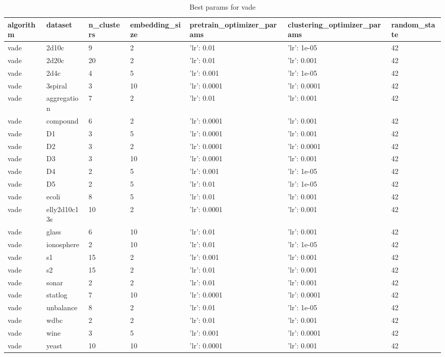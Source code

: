 \begin{table}[H]
\centering
\caption{Best params for vade}
\label{tab:params:vade}
\begin{tabular}{|l|l|l|l|l|l|l|}
\hline
algorithm & dataset & n\_clusters & embedding\_size & pretrain\_optimizer\_params & clustering\_optimizer\_params & random\_state \\
\hline
vade & 2d10c & 9 & 2 & {'lr': 0.01} & {'lr': 1e-05} & 42 \\
\hline
vade & 2d20c & 20 & 2 & {'lr': 0.01} & {'lr': 0.001} & 42 \\
\hline
vade & 2d4c & 4 & 5 & {'lr': 0.001} & {'lr': 1e-05} & 42 \\
\hline
vade & 3spiral & 3 & 10 & {'lr': 0.0001} & {'lr': 0.0001} & 42 \\
\hline
vade & aggregation & 7 & 2 & {'lr': 0.01} & {'lr': 0.001} & 42 \\
\hline
vade & compound & 6 & 2 & {'lr': 0.0001} & {'lr': 0.001} & 42 \\
\hline
vade & D1 & 3 & 5 & {'lr': 0.0001} & {'lr': 0.001} & 42 \\
\hline
vade & D2 & 3 & 2 & {'lr': 0.0001} & {'lr': 0.0001} & 42 \\
\hline
vade & D3 & 3 & 10 & {'lr': 0.0001} & {'lr': 0.001} & 42 \\
\hline
vade & D4 & 2 & 5 & {'lr': 0.001} & {'lr': 1e-05} & 42 \\
\hline
vade & D5 & 2 & 5 & {'lr': 0.01} & {'lr': 1e-05} & 42 \\
\hline
vade & ecoli & 8 & 5 & {'lr': 0.01} & {'lr': 0.001} & 42 \\
\hline
vade & elly2d10c13s & 10 & 2 & {'lr': 0.0001} & {'lr': 0.001} & 42 \\
\hline
vade & glass & 6 & 10 & {'lr': 0.01} & {'lr': 0.001} & 42 \\
\hline
vade & ionosphere & 2 & 10 & {'lr': 0.01} & {'lr': 1e-05} & 42 \\
\hline
vade & s1 & 15 & 2 & {'lr': 0.001} & {'lr': 0.001} & 42 \\
\hline
vade & s2 & 15 & 2 & {'lr': 0.01} & {'lr': 0.001} & 42 \\
\hline
vade & sonar & 2 & 2 & {'lr': 0.01} & {'lr': 0.001} & 42 \\
\hline
vade & statlog & 7 & 10 & {'lr': 0.0001} & {'lr': 0.0001} & 42 \\
\hline
vade & unbalance & 8 & 2 & {'lr': 0.01} & {'lr': 1e-05} & 42 \\
\hline
vade & wdbc & 2 & 2 & {'lr': 0.01} & {'lr': 0.001} & 42 \\
\hline
vade & wine & 3 & 5 & {'lr': 0.001} & {'lr': 0.0001} & 42 \\
\hline
vade & yeast & 10 & 10 & {'lr': 0.0001} & {'lr': 0.001} & 42 \\
\hline
\end{tabular}
\end{table}